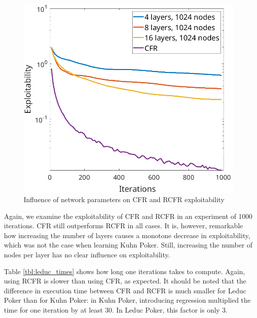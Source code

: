 \documentclass[10pt,a4paper]{article}
\begin{document}
\begin{figure}[h]
\includegraphics[scale=0.26]{Figures/rcfr_leduc_parameters3.png}
\caption{Influence of network parameters on CFR and RCFR exploitability}
\label{fig:rcfr_kuhn}
\end{figure}
\FloatBarrier 

Again, we examine the exploitability of CFR and RCFR in an experiment of 1000 iterations. CFR still outperforms RCFR in all cases. It is, however, remarkable how increasing the number of layers causes a monotone decrease in exploitability, which was not the case when learning Kuhn Poker. Still, increasing the number of nodes per layer has no clear influence on exploitability.

Table \ref{tbl:leduc_times} shows how long one iterations takes to compute. Again, using RCFR is slower than using CFR, as expected. It should be noted that the difference in execution time between CFR and RCFR is much smaller for Leduc Poker than for Kuhn Poker: in Kuhn Poker, introducing regression multiplied the time for one iteration by at least 30. In Leduc Poker, this factor is only 3.
\end{document}
